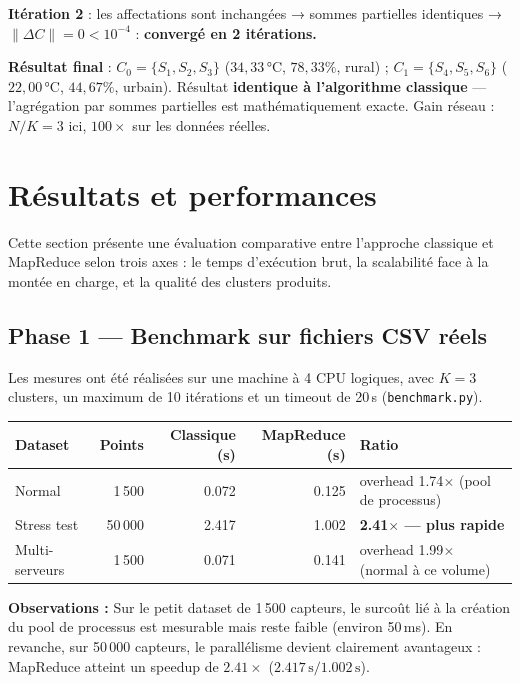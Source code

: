 \documentclass[12pt,a4paper]{article}
\begin{document}
\noindent\textbf{Itération 2} : les affectations sont inchangées → sommes partielles identiques
→ $\|\Delta C\|{=}0 < 10^{-4}$ : \textbf{convergé en 2 itérations.}

\noindent\textbf{Résultat final} : $C_0{=}\{S_1,S_2,S_3\}$ ($34{,}33\,\text{°C}$, $78{,}33\%$, rural) ;
$C_1{=}\{S_4,S_5,S_6\}$ ($22{,}00\,\text{°C}$, $44{,}67\%$, urbain).
Résultat \textbf{identique à l'algorithme classique} — l'agrégation par sommes partielles
est mathématiquement exacte. Gain réseau : $N/K{=}3$ ici, $100\times$ sur les données réelles.

\section{Résultats et performances}

Cette section présente une évaluation comparative entre l'approche classique et MapReduce
selon trois axes : le temps d'exécution brut, la scalabilité face à la montée en charge,
et la qualité des clusters produits.

\subsection{Phase 1 — Benchmark sur fichiers CSV réels}

Les mesures ont été réalisées sur une machine à 4 CPU logiques, avec $K=3$ clusters,
un maximum de 10 itérations et un timeout de 20\,s (\texttt{benchmark.py}).

\begin{center}
\small
\begin{tabular}{lrrrp{3.8cm}}
\toprule
\textbf{Dataset} & \textbf{Points}
  & \textbf{Classique (s)} & \textbf{MapReduce (s)} & \textbf{Ratio} \\
\midrule
Normal         & 1\,500  & 0.072 & 0.125 & overhead 1.74$\times$ (pool de processus) \\
Stress test    & 50\,000 & 2.417 & 1.002 & \textbf{2.41$\times$ — plus rapide} \\
Multi-serveurs & 1\,500  & 0.071 & 0.141 & overhead 1.99$\times$ (normal à ce volume) \\
\bottomrule
\end{tabular}
\end{center}

\noindent\textbf{Observations :} Sur le petit dataset de 1\,500 capteurs, le surcoût
lié à la création du pool de processus est mesurable mais reste faible (environ 50\,ms).
En revanche, sur 50\,000 capteurs, le parallélisme devient clairement avantageux :
MapReduce atteint un speedup de $2.41\times$ ($2.417\,\text{s} / 1.002\,\text{s}$).
\end{document}
